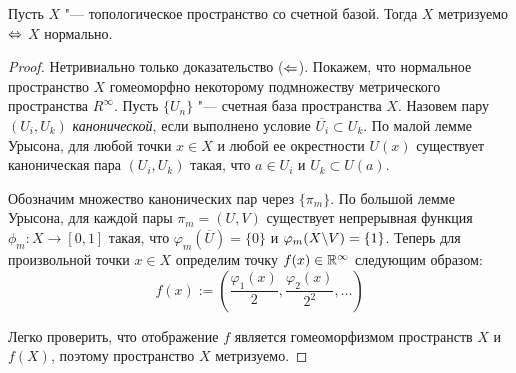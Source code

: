 \begin{theorem}
    Пусть $X$ "--- топологическое пространство со счетной базой. Тогда $X$ метризуемо $\Leftrightarrow$ $X$ нормально.
\end{theorem}

\begin{proof}
    Нетривиально только доказательство ($\Leftarrow$). Покажем, что нормальное пространство $X$ гомеоморфно некоторому подмножеству метрического пространства $R^\infty$. Пусть $\{U_n\}$  "--- счетная база пространства $X$. Назовем пару $(U_i, U_k)$ \textit{канонической}, если выполнено условие $\overline{U_i}\subset U_k$. По малой лемме Урысона, для любой точки $x \in X$ и любой ее окрестности $U(x)$ существует каноническая пара $(U_i, U_k)$ такая, что $a \in U_i$ и $U_k \subset U(a)$.
    
    Обозначим множество канонических пар через $\{\pi_m\}$. По большой лемме Урысона, для каждой пары $\pi_m = (U, V)$ существует непрерывная функция $\phi_m : X \rightarrow [0, 1]$ такая, что $\varphi_m(\overline U) = \{0\}$ и $\varphi_m(X \backslash V) = \{1\}$. Теперь для произвольной точки $x \in X$ определим точку $f(x) \in \mathbb{R}^\infty$ следующим образом:
    \[f(x) := \left(\frac{\varphi_1(x)}{2}, \frac{\varphi_2(x)}{2^2}, \dotsc\right)\]

    Легко проверить, что отображение $f$ является гомеоморфизмом пространств $X$ и $f(X)$, поэтому пространство $X$ метризуемо.
\end{proof}